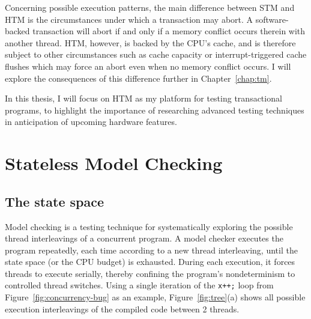 Concerning possible execution patterns,
the main difference between STM and HTM is the circumstances under which a transaction may abort.
A software-backed transaction will abort if and only if a memory conflict occurs therein with another thread.
HTM, however, is backed by the CPU's cache, and is therefore subject to other circumstances such as cache capacity or interrupt-triggered cache flushes which may force an abort even when no memory conflict occurs.
I will explore the consequences of this difference further in Chapter~\ref{chap:tm}.

In this thesis, I will focus on HTM as my platform for testing transactional programs,
to highlight the importance of researching advanced testing techniques in anticipation of upcoming hardware features.


\section{Stateless Model Checking}

\subsection{The state space}

Model checking \cite{verisoft} is a testing technique for systematically exploring the possible thread interleavings of a concurrent program.
A model checker executes the program repeatedly, each time according to a new thread interleaving, until the state space (or the CPU budget) is exhausted.
During each execution, it forces threads to execute serially, thereby confining the program's nondeterminism to controlled thread switches.
Using a single iteration of the {\tt x++;} loop from Figure~\ref{fig:concurrency-bug} as an example,
Figure~\ref{fig:tree}(a) shows all possible execution interleavings of the compiled code between 2 threads.

